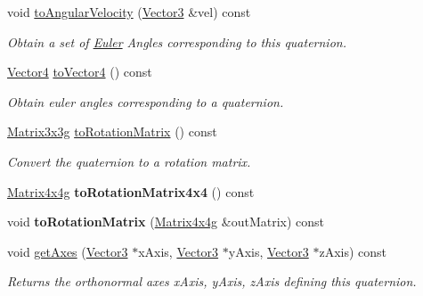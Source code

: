 \begin{Indent}
\begin{DoxyCompactItemize}
\item 
void \mbox{\hyperlink{classrev_1_1_quaternion_ab1f505103946b69780b2b8fb9a5876fe}{to\+Angular\+Velocity}} (\mbox{\hyperlink{classrev_1_1_vector}{Vector3}} \&vel) const
\begin{DoxyCompactList}\small\item\em Obtain a set of \mbox{\hyperlink{class_euler}{Euler}} Angles corresponding to this quaternion. \end{DoxyCompactList}\item 
\mbox{\hyperlink{classrev_1_1_vector}{Vector4}} \mbox{\hyperlink{classrev_1_1_quaternion_ab91b28cc13c12075e2017c79a7378348}{to\+Vector4}} () const
\begin{DoxyCompactList}\small\item\em Obtain euler angles corresponding to a quaternion. \end{DoxyCompactList}\item 
\mbox{\label{classrev_1_1_quaternion_afd26e100ef475aad52a63df5b9c00aa1}} 
\mbox{\hyperlink{classrev_1_1_square_matrix}{Matrix3x3g}} \mbox{\hyperlink{classrev_1_1_quaternion_afd26e100ef475aad52a63df5b9c00aa1}{to\+Rotation\+Matrix}} () const
\begin{DoxyCompactList}\small\item\em Convert the quaternion to a rotation matrix. \end{DoxyCompactList}\item 
\mbox{\label{classrev_1_1_quaternion_af2484fbd45d1dd2216910baf3efcb9be}} 
\mbox{\hyperlink{classrev_1_1_square_matrix}{Matrix4x4g}} {\bfseries to\+Rotation\+Matrix4x4} () const
\item 
\mbox{\label{classrev_1_1_quaternion_adc0a1b774a81303aa84efbb4e757b37a}} 
void {\bfseries to\+Rotation\+Matrix} (\mbox{\hyperlink{classrev_1_1_square_matrix}{Matrix4x4g}} \&out\+Matrix) const
\item 
\mbox{\label{classrev_1_1_quaternion_a4557e6f45074dbf51a23716bb145696b}} 
void \mbox{\hyperlink{classrev_1_1_quaternion_a4557e6f45074dbf51a23716bb145696b}{get\+Axes}} (\mbox{\hyperlink{classrev_1_1_vector}{Vector3}} $\ast$x\+Axis, \mbox{\hyperlink{classrev_1_1_vector}{Vector3}} $\ast$y\+Axis, \mbox{\hyperlink{classrev_1_1_vector}{Vector3}} $\ast$z\+Axis) const
\begin{DoxyCompactList}\small\item\em Returns the orthonormal axes x\+Axis, y\+Axis, z\+Axis defining this quaternion. \end{DoxyCompactList}\end{DoxyCompactItemize}
\end{Indent}
